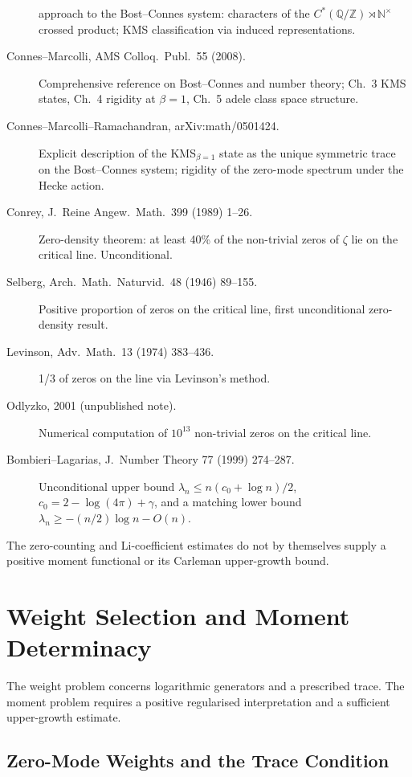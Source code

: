 \begin{description}
approach to the Bost--Connes system: characters of the
\(C^{*}(\mathbb{Q}/\mathbb{Z})\rtimes\mathbb{N}^{\times}\) crossed
product; KMS classification via induced representations.
\item[Connes--Marcolli, AMS Colloq.~Publ.~55 (2008).] Comprehensive
reference on Bost--Connes and number theory; Ch.~3 KMS states,
Ch.~4 rigidity at \(\beta=1\), Ch.~5 adele class space structure.
\item[Connes--Marcolli--Ramachandran, arXiv:math/0501424.] Explicit
description of the KMS\({}_{\beta=1}\) state as the unique symmetric
trace on the Bost--Connes system; rigidity of the zero-mode spectrum
under the Hecke action.
\item[Conrey, J.~Reine Angew.~Math.~399 (1989) 1--26.] Zero-density
theorem: at least 40\% of the non-trivial zeros of \(\zeta\) lie on the
critical line. Unconditional.
\item[Selberg, Arch.~Math.~Naturvid.~48 (1946) 89--155.] Positive
proportion of zeros on the critical line, first unconditional
zero-density result.
\item[Levinson, Adv.~Math.~13 (1974) 383--436.] 1/3 of zeros on the
line via Levinson's method.
\item[Odlyzko, 2001 (unpublished note).] Numerical computation of
\(10^{13}\) non-trivial zeros on the critical line.
\item[Bombieri--Lagarias, J.~Number Theory 77 (1999) 274--287.]
Unconditional upper bound
\(\lambda_{n}\leq n(c_{0}+\log n)/2\), \(c_{0}=2-\log(4\pi)+\gamma\), and
a matching lower bound \(\lambda_{n}\geq -(n/2)\log n-O(n)\).
\end{description}

The zero-counting and Li-coefficient estimates do not by themselves
supply a positive moment functional or its Carleman upper-growth bound.

\section{Weight Selection and Moment Determinacy}
\label{v4-arith:hpar-det:table}

The weight problem concerns logarithmic generators and a prescribed
trace. The moment problem requires a positive regularised
interpretation and a sufficient upper-growth estimate.

\subsection{Zero-Mode Weights and the Trace Condition}
\label{v4-arith:hpar-det:cycle-1}

